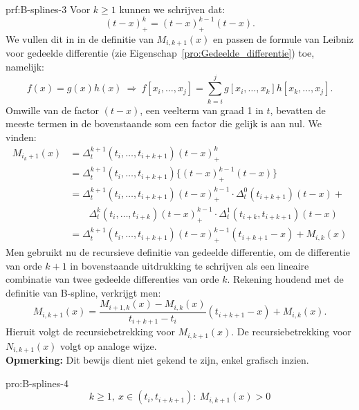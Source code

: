 \begin{prf}{prf:B-splines-3}
    Voor $k \geq 1$ kunnen we schrijven dat:
    \begin{equation*}
        (t-x)^k_+ = (t-x)^{k-1}_+ (t-x).
    \end{equation*}
    We vullen dit in in de definitie van $M_{i,k+1}(x)$ en passen de formule van Leibniz voor gedeelde differentie  (zie Eigenschap~\ref{pro:Gedeelde_differentie}) toe, namelijk:
    \begin{equation*}
        f(x) = g(x)h(x) \ \Rightarrow \ f[x_i,\ldots,x_j] = \sum_{k=i}^{j} g[x_i,\ldots,x_k]h[x_k,\ldots,x_j].
    \end{equation*}
    Omwille van de factor $(t-x)$, een veelterm van graad 1 in $t$, bevatten de meeste termen in de bovenstaande som een factor die gelijk is aan nul. We vinden:
    \begin{align*}
        M_{i_k+1}(x) 
            &= \Delta_t^{k+1}(t_i,\ldots,t_{i+k+1}) (t-x)^k_+ \\
            &= \Delta_t^{k+1}(t_i,\ldots,t_{i+k+1}) \{(t-x)^{k-1}_+ (t-x)\} \\
            &= \Delta_t^{k+1}(t_i,\ldots,t_{i+k+1}) (t-x)^{k-1}_+ \cdot \Delta^0_t(t_{i+k+1})(t-x) + \\ 
            &   \quad \quad \Delta_t^{k}(t_i,\ldots,t_{i+k})(t-x)^{k-1}_+ \cdot \Delta^1_t(t_{i+k},t_{i+k+1})(t-x) \\
            &= \Delta_t^{k+1}(t_i,\ldots,t_{i+k+1}) (t-x)^{k-1}_+(t_{i+k+1}-x) + M_{i,k}(x) 
    \end{align*}
    Men gebruikt nu de recursieve definitie van gedeelde differentie, om de differentie van orde $k+1$ in bovenstaande uitdrukking te schrijven als een lineaire combinatie van twee gedeelde differenties van orde $k$. Rekening houdend met de definitie van B-spline, verkrijgt men:
    \begin{equation*}
        M_{i,k+1}(x) =  \frac{M_{i+1,k}(x) - M_{i,k}(x)}{t_{i+k+1}-t_i}(t_{i+k+1}-x) + M_{i,k}(x).
    \end{equation*}
    Hieruit volgt de recursiebetrekking voor $M_{i,k+1}(x)$. De recursiebetrekking voor $N_{i,k+1}(x)$ volgt op analoge wijze. \\

    \textbf{Opmerking:}  Dit bewijs dient niet gekend te zijn, enkel grafisch inzien.
\end{prf}

\begin{pro}[B-spline]{pro:B-splines-4}
    \begin{equation*}
        k\geq 1,\ x \in (t_i,t_{i+k+1}): \ M_{i,k+1}(x) > 0
    \end{equation*}
    \vspace{-0.2cm}
\end{pro}

